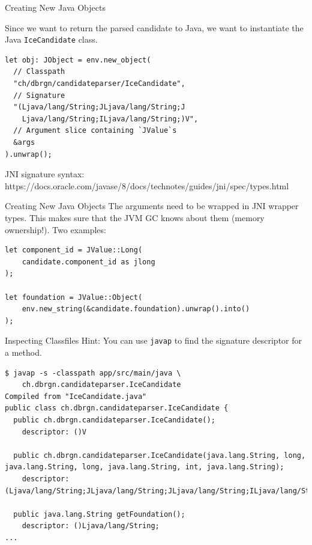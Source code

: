 \documentclass[aspectratio=1610,14pt,t]{beamer}
\begin{document}
\begin{frame}[c,fragile]{Creating New Java Objects}

  Since we want to return the parsed candidate to Java, we want to instantiate
  the Java \texttt{IceCandidate} class.

  \begin{verbatim}
let obj: JObject = env.new_object(
  // Classpath
  "ch/dbrgn/candidateparser/IceCandidate",
  // Signature
  "(Ljava/lang/String;JLjava/lang/String;J
    Ljava/lang/String;ILjava/lang/String;)V",
  // Argument slice containing `JValue`s
  &args
).unwrap();
  \end{verbatim}

  JNI signature syntax:\\
  {\footnotesize https://docs.oracle.com/javase/8/docs/technotes/guides/jni/spec/types.html}

\end{frame}

\begin{frame}[c,fragile]{Creating New Java Objects}
  The arguments need to be wrapped in JNI wrapper types. This makes sure that
  the JVM GC knows about them (memory ownership!). Two examples:

  \begin{verbatim}
let component_id = JValue::Long(
    candidate.component_id as jlong
);

let foundation = JValue::Object(
    env.new_string(&candidate.foundation).unwrap().into()
);
  \end{verbatim}
\end{frame}

\begin{frame}[c,fragile]{Inspecting Classfiles}
  Hint: You can use \texttt{javap} to find the signature descriptor for a
  method.

  \begin{verbatim}
$ javap -s -classpath app/src/main/java \
    ch.dbrgn.candidateparser.IceCandidate
Compiled from "IceCandidate.java"
public class ch.dbrgn.candidateparser.IceCandidate {
  public ch.dbrgn.candidateparser.IceCandidate();
    descriptor: ()V

  public ch.dbrgn.candidateparser.IceCandidate(java.lang.String, long, java.lang.String, long, java.lang.String, int, java.lang.String);
    descriptor: (Ljava/lang/String;JLjava/lang/String;JLjava/lang/String;ILjava/lang/String;)V

  public java.lang.String getFoundation();
    descriptor: ()Ljava/lang/String;
...
  \end{verbatim}

\end{frame}
\end{document}
